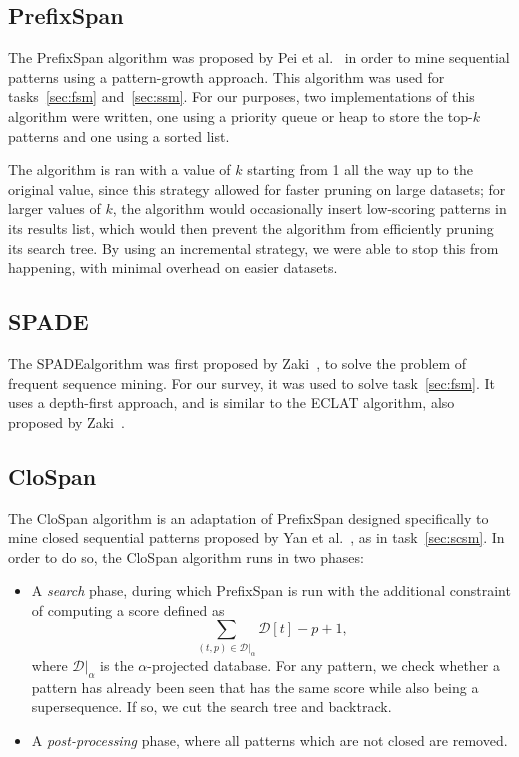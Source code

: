 \documentclass{sigkddExp}
\newcommand{\db}{\mathcal{D}}
\newcommand{\ps}{\textsf{PrefixSpan}}
\newcommand{\cs}{\textsf{CloSpan}}
\newcommand{\spade}{\textsf{SPADE}}
\begin{document}
\subsection{PrefixSpan}
The \ps{} algorithm was proposed by Pei et al.~\cite{Pei2001, Pei2004} in order to mine sequential patterns using a pattern-growth approach.
This algorithm was used for tasks~\ref{sec:fsm} and~\ref{sec:ssm}.
For our purposes, two implementations of this algorithm were written, one using a priority queue or heap to store the top-\(k\) patterns and one using a sorted list.

The algorithm is ran with a value of \(k\) starting from 1 all the way up to the original value, since this strategy allowed for faster pruning on large datasets; for larger values of \(k\), the algorithm would occasionally insert low-scoring patterns in its results list, which would then prevent the algorithm from efficiently pruning its search tree.
By using an incremental strategy, we were able to stop this from happening, with minimal overhead on easier datasets.

\subsection{SPADE}
The \spade algorithm was first proposed by Zaki~\cite{Zaki2001}, to solve the problem of frequent sequence mining.
For our survey, it was used to solve task~\ref{sec:fsm}.
It uses a depth-first approach, and is similar to the \textsf{ECLAT} algorithm, also proposed by Zaki~\cite{Zaki2000}.

\subsection{CloSpan}
\label{sec:clospan}
The \cs{} algorithm is an adaptation of \ps{} designed specifically to mine closed sequential patterns proposed by Yan et al.~\cite{Yan2003}, as in task~\ref{sec:scsm}.
In order to do so, the \cs{} algorithm runs in two phases:
\begin{itemize}
	\item A \emph{search} phase, during which \ps{} is run with the additional constraint of computing a score defined as
	\begin{equation}
	\sum_{(t, p) \in \db|_\alpha} \db[t] - p + 1,
	\end{equation}
	where \(\db|_\alpha\) is the \(\alpha\)-projected database.
	For any pattern, we check whether a pattern has already been seen that has the same score while also being a supersequence.
	If so, we cut the search tree and backtrack.
	\item A \emph{post-processing} phase, where all patterns which are not closed are removed.
\end{itemize}
\end{document}
